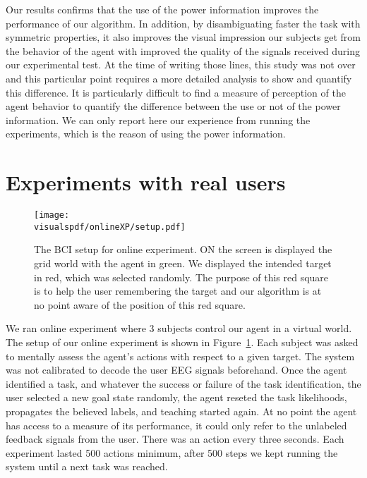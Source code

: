 Our results confirms that the use of the power information improves the performance of our algorithm. In addition, by disambiguating faster the task with symmetric properties, it also improves the visual impression our subjects get from the behavior of the agent with improved the quality of the signals received during our experimental test. At the time of writing those lines, this study was not over and this particular point requires a more detailed analysis to show and quantify this difference. It is particularly difficult to find a measure of perception of the agent behavior to quantify the difference between the use or not of the power information. We can only report here our experience from running the experiments, which is the reason of using the power information.

\section{Experiments with real users}

\begin{figure}[!htbp]
\centering
\texttt{[image: \\visualspdf/onlineXP/setup.pdf]}
\caption{The BCI setup for online experiment. ON the screen is displayed the grid world with the agent in green. We displayed the intended target in red, which was selected randomly. The purpose of this red square is to help the user remembering the target and our algorithm is at no point aware of the position of this red square.}
\label{fig:BCIsetup}
\end{figure}

We ran online experiment where 3 subjects  control our agent in a virtual world. The setup of our online experiment is shown in Figure~\ref{fig:BCIsetup}. Each subject was asked to mentally assess the agent's actions with respect to a given target. The system was not calibrated to decode the user EEG signals beforehand. Once the agent identified a task, and whatever the success or failure of the task identification, the user selected a new goal state randomly, the agent reseted the task likelihoods, propagates the believed labels, and teaching started again. At no point the agent has access to a measure of its performance, it could only refer to the unlabeled feedback signals from the user. There was an action every three seconds. Each experiment lasted 500 actions minimum, after 500 steps we kept running the system until a next task was reached.

